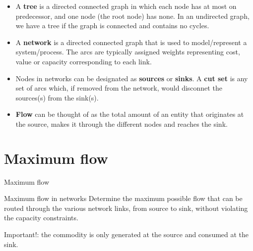 \documentclass[c]{beamer}
\begin{document}
\begin{frame}
  \begin{itemize}
    \item A {\bf tree} is a directed connected graph in which each node has at most on predecessor, and one node (the root node) has none. In an undirected graph, we have a tree if the graph is connected and contains no cycles.
    \item A {\bf network} is a directed connected graph that is used to model/represent a system/process. The arcs are typically assigned weights representing cost, value or capacity corresponding to each link.
    \item Nodes in networks can be designated as {\bf sources} or {\bf sinks}. A {\bf cut set} is any set of arcs which, if removed from the network, would disconnet the sources(s) from the sink(s).
    \item {\bf Flow} can be thought of as the total amount of an entity that originates at the source, makes it through the different nodes and reaches the sink.
  \end{itemize}
\end{frame}

\section{Maximum flow}

\begin{frame}{Maximum flow}
  \begin{block}{Maximum flow in networks}
    Determine the maximum possible flow that can be routed through the various network links, from source to sink, without violating the capacity constraints.

    Important!: the commodity is only generated at the source and consumed at the sink.
  \end{block}
\end{frame}
\end{document}
